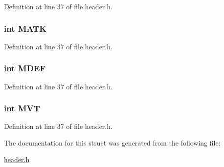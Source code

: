 Definition at line 37 of file header.\-h.

\hypertarget{structt__stats_ae183b98dc9aca9905f531bfd4dd51a1c}{
\subsubsection[{M\-A\-T\-K}]{\setlength{\rightskip}{0pt plus 5cm}int M\-A\-T\-K}}\label{structt__stats_ae183b98dc9aca9905f531bfd4dd51a1c}


Definition at line 37 of file header.\-h.

\hypertarget{structt__stats_a92ab6d75a95ed209b7875314f53fb555}{
\subsubsection[{M\-D\-E\-F}]{\setlength{\rightskip}{0pt plus 5cm}int M\-D\-E\-F}}\label{structt__stats_a92ab6d75a95ed209b7875314f53fb555}


Definition at line 37 of file header.\-h.

\hypertarget{structt__stats_a397f7940443939415a50f324dc5f56f9}{
\subsubsection[{M\-V\-T}]{\setlength{\rightskip}{0pt plus 5cm}int M\-V\-T}}\label{structt__stats_a397f7940443939415a50f324dc5f56f9}


Definition at line 37 of file header.\-h.



The documentation for this struct was generated from the following file\-:\begin{DoxyCompactItemize}
\item 
\hyperlink{header_8h}{header.\-h}\end{DoxyCompactItemize}
